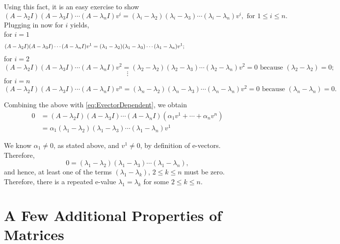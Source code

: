 Using this fact, it is an easy exercise to show 
\begin{equation}
\label{eq:ProductMatrices}
(A - \lambda_2 I)(A - \lambda_3 I)\dotsb(A - \lambda_n I)v^i = (\lambda_i - \lambda_2)(\lambda_i - \lambda_3)\dotsb(\lambda_i - \lambda_n)v^i, \text{ for  } 1 \leq i \leq n.
\end{equation}
Plugging in now for $i$ yields,\\

   for $i = 1$ $$ (A - \lambda_2 I)(A - \lambda_3 I)\dotsb(A - \lambda_n I)v^1 = (\lambda_1 - \lambda_2)(\lambda_1 - \lambda_3)\dotsb(\lambda_1 - \lambda_n)v^1; \hspace*{4.1cm}$$
    for $i = 2$ $$(A - \lambda_2 I)(A - \lambda_3 I)\dotsb(A - \lambda_n I)v^2= (\lambda_2 - \lambda_2)(\lambda_2 - \lambda_3)\dotsb(\lambda_2 - \lambda_n)v^2 = 0 \text{ because } (\lambda_2 - \lambda_2)=0;$$
    $$ \vdots$$
for $i = n$ $$ (A - \lambda_2 I)(A - \lambda_3 I)\dotsb(A - \lambda_n I)v^n = (\lambda_n - \lambda_2)(\lambda_n - \lambda_3)\dotsb(\lambda_n - \lambda_n)v^2 = 0 \text{ because } (\lambda_n - \lambda_n)=0. $$



    Combining the above with \eqref{eq:EvectorDependent}, we obtain
    \begin{align*}
        0 &= (A - \lambda_2 I)(A - \lambda_3 I)\dotsb(A - \lambda_n I)(\alpha_1 v^1 + \dotsb + \alpha_n v^n)\\
        & = \alpha_1 (\lambda_1 - \lambda_2)(\lambda_1 - \lambda_3)\dotsb(\lambda_1 - \lambda_n)v^1
    \end{align*}

    We know $\alpha_1 \neq 0$, as stated above, and $v^1 \neq 0$, by definition of e-vectors. Therefore, 
    $$0 = (\lambda_1 - \lambda_2)(\lambda_1 - \lambda_3)\dotsb(\lambda_1 - \lambda_n),$$
    and hence, at least one of the terms $(\lambda_1-\lambda_k)$, $2 \le k \le n$ must be zero. Therefore, there is a repeated e-value $\lambda_1 = \lambda_k $ for some $2 \leq k \leq n$. 
    \Qed



\vspace*{.2cm}

\section{A Few Additional Properties of Matrices}

\vspace*{.2cm}


